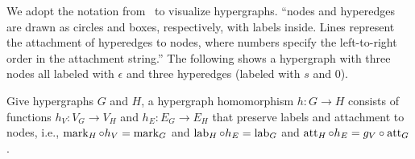 \begin{example}
    We adopt the notation from~\cite[]{plump2018modular} to visualize hypergraphs. \enquote{nodes and hyperedges are drawn as circles and boxes, respectively, with labels inside. Lines represent the attachment of hyperedges to nodes, where numbers specify the left-to-right order in the attachment string.} The following shows a hypergraph with three nodes all labeled with $\epsilon$ and three hyperedges (labeled with $s$ and $0$).

\end{example}

\begin{definition}
    Give hypergraphs $G$ and $H$, a hypergraph homomorphism $h : G \to H$ consists of functions $h_V : V_G \to V_H$ and $h_E : E_G \to E_H$ that preserve labels and attachment to nodes, i.e., $\operatorname{mark}_H \circ h_V = \operatorname{mark}_G$ and $\operatorname{lab}_H \circ h_E = \operatorname{lab}_G$ and $\operatorname{att}_H \circ h_E = g_V \circ \operatorname{att}_G$.
\end{definition}